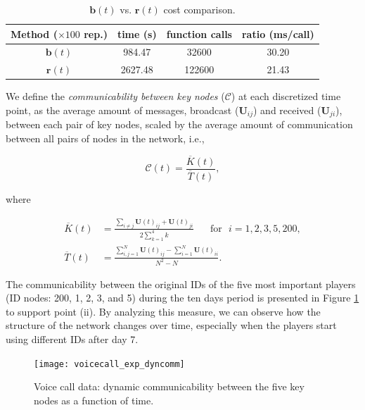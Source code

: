 \begin{table}[ht]
            \bigskip
		\centering %
		\begin{tabular}{c c c c} %
			\hline\hline %
			\textbf{Method ($\times 100$ rep.)} & \textbf{time (s)} & \textbf{function calls} & \textbf{ratio (ms/call)} \\ [0.1ex] %
			\hline\hline 
			$\mathbf{b}(t)$ & 984.47 & 32600 & 30.20 \\ %
			$\mathbf{r}(t)$ & 2627.48 & 122600 & 21.43 \\ [0.5ex] %
			\hline %
		\end{tabular}
		\caption{$\mathbf{b}(t)$ vs. $\mathbf{r}(t)$ cost comparison.} 
       \label{table:btrt} 
\end{table}


We define the \textit{communicability between key nodes} ($\mathcal{C}$) at each discretized time point, as the average amount of messages, broadcast ($\mathbf{U}_{ij}$) and received ($\mathbf{U}_{ji}$), between each pair of key nodes, scaled by the average amount of communication between all pairs of nodes in the network, i.e.,

\begin{equation*}
    \mathcal{C}(t) = \frac{\overline{K}(t)}{\overline{T}(t)},
\end{equation*}

where

\begin{align*}
    \overline{K}(t) &=\frac{\sum_{i\ne j}\mathbf{U}(t)_{ij} + \mathbf{U}(t)_{ji}}{2\sum_{k=1}^4 k} \text{~~~~~for~~} i=1,2,3,5,200 ,\\
    \overline{T}(t) &=\frac{\sum_{i,j=1}^N \mathbf{U}(t)_{ij} - \sum_{i=1}^N \mathbf{U}(t)_{ii}}{N^2-N}.
\end{align*}

The communicability between the original IDs of the five most important players (ID nodes: 200, 1, 2, 3, and 5) during the ten days period is presented in Figure \ref{fig:ve2} to support point (ii). By analyzing this measure, we can observe how the structure of the network changes over time, especially when the players start using different IDs after day 7.

\begin{figure}[h]\centering
    \texttt{[image: voicecall\_exp\_dyncomm]}
    \caption{Voice call data: dynamic communicability between the five key nodes as a function of time.}
    \label{fig:ve2}
    \bigskip
\end{figure}